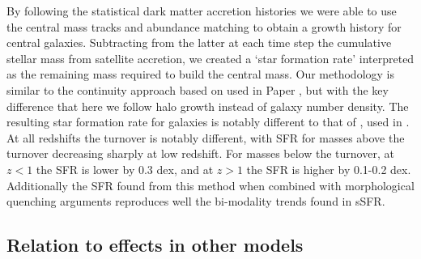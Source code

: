 By following the statistical dark matter accretion histories we were able to use the central mass tracks and abundance matching to obtain a growth history for central galaxies. Subtracting from the latter at each time step the cumulative stellar mass from satellite accretion, we created a `star formation rate' interpreted as the remaining mass required to build the central mass. Our methodology is similar to the continuity approach based on \citet{Leja2015ReconcilingFunction} used in Paper , but with the key difference that here we follow halo growth instead of galaxy number density. 
The resulting star formation rate for galaxies is notably different to that of \citet{Tomczak2014GalaxyGalaxies}, used in \citet{Grylls2019PredictingSteel.}. At all redshifts the turnover is notably different, with SFR for masses above the turnover decreasing sharply at low redshift. For masses below the turnover, at $z < 1$ the SFR is lower by 0.3 dex, and at $z > 1$ the SFR is higher by 0.1-0.2 dex. Additionally the SFR found from this method when combined with morphological quenching arguments reproduces well the bi-modality trends found in sSFR.

\subsection{Relation to effects in other models}

